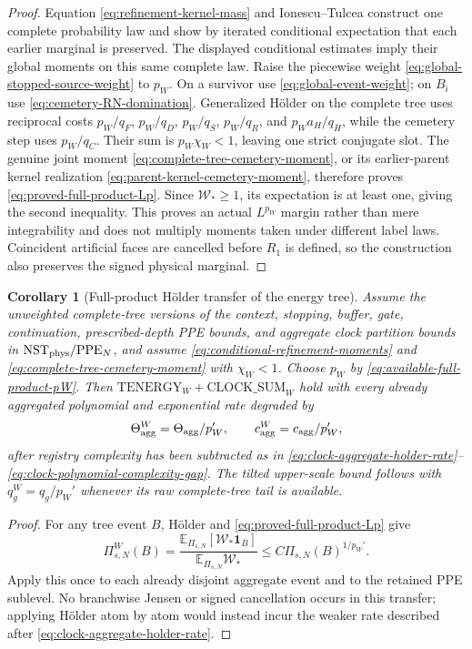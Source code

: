 \documentclass[11pt]{article}
\newtheorem{corollary}[theorem]{Corollary}
\newcommand{\one}{\mathbf 1}
\begin{document}
\begin{proof}
Equation \eqref{eq:refinement-kernel-mass} and Ionescu--Tulcea construct one
complete probability law and show by iterated conditional expectation that
each earlier marginal is preserved.  The displayed conditional estimates
imply their global moments on this same complete law.  Raise the piecewise weight
\eqref{eq:global-stopped-source-weight} to $p_W$.  On a survivor use
\eqref{eq:global-event-weight}; on $B_i$ use
\eqref{eq:cemetery-RN-domination}.  Generalized H\"older on the complete tree
uses reciprocal costs
$p_W/q_F$, $p_W/q_D$, $p_W/q_S$, $p_W/q_R$, and
$p_Wa_H/q_H$, while the cemetery step uses $p_W/q_C$.  Their sum is
$p_W\chi_W<1$, leaving one strict conjugate slot.  The genuine joint moment
\eqref{eq:complete-tree-cemetery-moment}, or its earlier-parent kernel
realization \eqref{eq:parent-kernel-cemetery-moment}, therefore proves
\eqref{eq:proved-full-product-Lp}.  Since $\mathscr W_*\ge1$, its expectation
is at least one, giving the second inequality.  This proves an actual
$L^{p_W}$ margin rather than mere integrability and does not multiply moments
taken under different label laws.
Coincident artificial faces are cancelled before $R_1$ is defined, so the
construction also preserves the signed physical marginal.
\end{proof}

\begin{corollary}[Full-product H\"older transfer of the energy tree]
\label{cor:full-product-holder-energy}
Assume the unweighted complete-tree versions of the context, stopping,
buffer, gate, continuation, prescribed-depth PPE bounds, and aggregate clock
partition bounds in
$\mathrm{NST}_{\rm phys}/\mathrm{PPE}_{N}$, and assume
\eqref{eq:conditional-refinement-moments} and
\eqref{eq:complete-tree-cemetery-moment} with $\chi_W<1$.  Choose $p_W$ by
\eqref{eq:available-full-product-pW}.  Then
$\mathrm{TENERGY}_{W}+\mathrm{CLOCK\_SUM}_{W}$ hold with every already
aggregated polynomial and exponential rate degraded by
\[
 \Theta_{\rm agg}^{W}=\Theta_{\rm agg}/p_W',\qquad
 c_{\rm agg}^{W}=c_{\rm agg}/p_W',
\]
after registry complexity has been subtracted as in
\eqref{eq:clock-aggregate-holder-rate}--
\eqref{eq:clock-polynomial-complexity-gap}.
The tilted upper-scale bound follows with $q_g^{W}=q_g/p_W'$ whenever its
raw complete-tree tail is available.
\end{corollary}

\begin{proof}
For any tree event $B$, H\"older and
\eqref{eq:proved-full-product-Lp} give
\[
 \Pi_{s,N}^{W}(B)
 =\frac{\mathbb E_{\Pi_{s,N}}[\mathscr W_*\one_B]}
        {\mathbb E_{\Pi_{s,N}}\mathscr W_*}
 \le C\Pi_{s,N}(B)^{1/p_W'}.
\]
Apply this once to each already disjoint aggregate event and to the retained
PPE sublevel.  No branchwise Jensen or signed cancellation occurs in this
transfer; applying H\"older atom by atom would instead incur the weaker rate
described after \eqref{eq:clock-aggregate-holder-rate}.
\end{proof}
\end{document}
